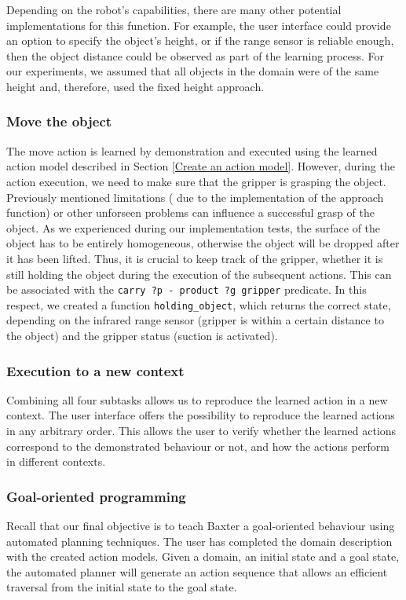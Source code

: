 Depending on the robot's capabilities, there are many other potential implementations for this function.
For example, the user interface could provide an option to specify the object's height, or if the range sensor is reliable enough, then the object distance could be observed as part of the learning process.
For our experiments, we assumed that all objects in the domain were of the same height and, therefore, used the fixed height approach.


\subsubsection{Move the object}\label{holdingObject}
The move action is learned by demonstration and executed using the learned action model described in Section \ref{Create an action model}.
However, during the action execution, we need to make sure that the gripper is grasping the object.
Previously mentioned limitations (\eg
due to the implementation of the approach function) or other unforseen problems can influence a successful grasp of the object.
As we experienced during our implementation tests, the surface of the object has to be entirely homogeneous, otherwise the object will be dropped after it has been lifted.
Thus, it is crucial to keep track of the gripper, \ie
whether it is still holding the object during the execution of the subsequent actions.
This can be associated with the \texttt{carry ?p - product ?g gripper} predicate.
In this respect, we created a function \texttt{holding\_object}, which returns the correct state, depending on the infrared range sensor (gripper is within a certain distance to the object) and the gripper status (suction is activated).

\subsubsection{Execution to a new context}
Combining all four subtasks allows us to reproduce the learned action in a new context.
The user interface offers the possibility to reproduce the learned actions in any arbitrary order.
This allows the user to verify whether the learned actions correspond to the demonstrated behaviour or not, and how the actions perform in different contexts.

\subsubsection{Goal-oriented programming}
Recall that our final objective is to teach Baxter a goal-oriented behaviour using automated planning techniques.
The user has completed the domain description with the created action models.
Given a domain, an initial state and a goal state, the automated planner will generate an action sequence that allows an efficient traversal from the initial state to the goal state.


